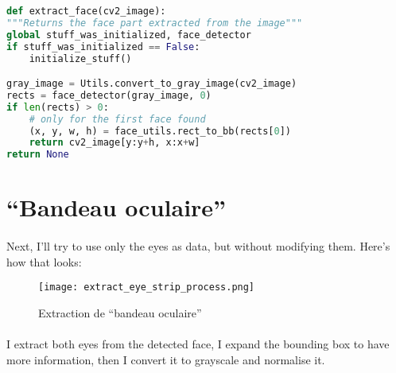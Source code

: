 \begin{lstlisting}[language=Python, caption = Extraction du visage en Python3]
def extract_face(cv2_image):
"""Returns the face part extracted from the image"""
global stuff_was_initialized, face_detector
if stuff_was_initialized == False:
    initialize_stuff()

gray_image = Utils.convert_to_gray_image(cv2_image)
rects = face_detector(gray_image, 0)
if len(rects) > 0:
    # only for the first face found
    (x, y, w, h) = face_utils.rect_to_bb(rects[0])
    return cv2_image[y:y+h, x:x+w]
return None
\end{lstlisting}

\section{``Bandeau oculaire''}
\paragraph{}
Next, I'll try to use only the eyes as data, but without modifying them.
Here's how that looks:

\begin{figure}[H]
    \centering
    \texttt{[image: extract\_eye\_strip\_process.png]}
    \caption{Extraction de ``bandeau oculaire''}
    \label{fig_extracting_eye_strip}
\end{figure}

\paragraph{}
I extract both eyes from the detected face, I expand the bounding box to have more information, then I convert it to grayscale and normalise it.

